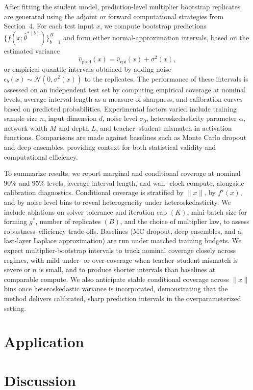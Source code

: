 \documentclass[12pt, titlepage, reqno]{article}
\begin{document}
After fitting the student model, prediction-level multiplier bootstrap
replicates are generated using the adjoint or forward computational
strategies from Section~4. For each test input $x$, we compute
bootstrap predictions $\{f(x;\hat\theta^{*(b)})\}_{b=1}^B$ and form
either normal-approximation intervals, based on the estimated variance
\[
  \widehat v_{\mathrm{pred}}(x) =
  \widehat v_{\mathrm{epi}}(x) + \sigma^2(x),
\]
or empirical quantile intervals obtained by adding noise
$\epsilon_b(x)\sim\mathcal{N}(0,\sigma^2(x))$ to the replicates. The
performance of these intervals is assessed on an independent test set
by computing empirical coverage at nominal levels, average interval
length as a measure of sharpness, and calibration curves based on
predicted probabilities. Experimental factors varied include training
sample size $n$, input dimension $d$, noise level $\sigma_0$,
heteroskedasticity parameter $\alpha$, network width $M$ and depth $L$,
and teacher–student mismatch in activation functions. Comparisons are
made against baselines such as Monte Carlo dropout and deep ensembles,
providing context for both statistical validity and computational
efficiency.


To summarize results, we report marginal and conditional coverage at
nominal $90\%$ and $95\%$ levels, average interval length, and wall-
clock compute, alongside calibration diagnostics. Conditional coverage
is stratified by $\|x\|$, by $f^\star(x)$, and by noise level bins to
reveal heterogeneity under heteroskedasticity. We include ablations on
solver tolerance and iteration cap $(K)$, mini-batch size for forming
$g^{*}$, number of replicates $(B)$, and the choice of multiplier law,
to assess robustness–efficiency trade-offs. Baselines (MC dropout,
deep ensembles, and a last-layer Laplace approximation) are run under
matched training budgets. We expect multiplier-bootstrap intervals to
track nominal coverage closely across regimes, with mild under- or
over-coverage when teacher–student mismatch is severe or $n$ is small,
and to produce shorter intervals than baselines at comparable compute.
We also anticipate stable conditional coverage across $\|x\|$ bins
once heteroskedastic variance is incorporated, demonstrating that the
method delivers calibrated, sharp prediction intervals in the
overparameterized setting.

\section{Application}

\section{Discussion}





	
\end{document}
